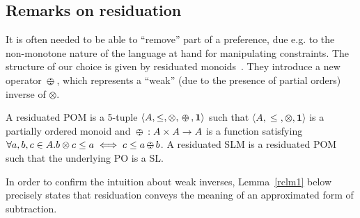 \documentclass{llncs}
\def\monid{{\mathbf 0}}
\def\monop{\otimes}
\def\odiv{\, {\ominus\hspace{-7.7pt} \div} \,}
\def\monid{\mathbf{1}}
\begin{document}
%
%
%

\subsection{Remarks on residuation}\label{sec:ror}
It is often needed to be able to ``remove'' part of a preference, due e.g. 
to the non-monotone nature of the language at hand
for manipulating constraints. 
%
The structure of our choice is given by residuated monoids~\cite{golanShort}. 
%
They introduce a new operator $\odiv$, which represents a ``weak'' (due to the presence of partial orders) inverse of $\otimes$.

\begin{definition}[Residuation]\label{def:repo}
	A residuated POM is a 5-tuple $\langle A, \leq, \monop, \odiv, \monid \rangle$ such that
	$\langle A, \leq, \monop, \monid \rangle$ is a partially ordered monoid and
	$\odiv: A \times A \rightarrow A$ is a function satisfying $\forall a, b, c \in A. b \monop c \leq a \iff c \leq a \odiv b$. A residuated SLM is a
	residuated POM such that the underlying PO is a SL.
\end{definition}

%

In order to confirm the intuition about weak inverses,
Lemma~\ref{rclm1} below precisely states that residuation conveys the meaning of 
an approximated form of subtraction.
%
\end{document}
